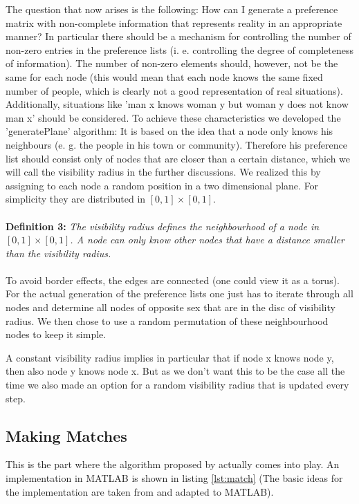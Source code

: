 \documentclass[11pt]{article}
\begin{document}
The question that now arises is the following: How can I generate a preference matrix
with non-complete information that represents reality in an appropriate manner? In 
particular there should be a mechanism for controlling the number of non-zero entries 
in the preference lists (i. e. controlling the degree of completeness of information). The 
number of non-zero elements should, however, not be the same for each node (this would 
mean that each node knows the same fixed number of people, which is clearly not a good 
representation of real situations). Additionally, situations like 'man x knows woman y but 
woman y does not know man x' should be considered.
To achieve these characteristics we developed the 'generatePlane' algorithm: It is based on 
the idea that a node only knows his neighbours (e. g. the people in his town or community). 
Therefore his preference list should consist only of nodes that are closer than a certain 
distance, which we will call the visibility radius in the further discussions. We realized this 
by assigning to each node a random position in a two dimensional plane. For simplicity they 
are distributed in $[0,1]\times[0,1]$. 
\\
\\
\textbf{Definition 3: }\textit{The visibility radius defines the neighbourhood of a node in $[0,1]\times[0,1]$. A node can only know other
nodes that have a distance smaller than the visibility radius.\label{eq:3}}
\\
\\
To avoid border effects, the edges are connected (one could 
view it as a torus). For the actual generation of the preference lists one just has to iterate 
through all nodes and determine all nodes of opposite sex that are in the disc of visibility 
radius. We then chose to use a random permutation of these neighbourhood nodes to keep it 
simple.

A constant visibility radius implies in particular that if node x knows node y, then also node y knows node x. But as we don't want this
to be the case all the time we also made an option for a random visibility radius that is updated every step.

\subsection{Making Matches}

This is the part where the algorithm proposed by \citet{1962} actually comes into play. An implementation in MATLAB is shown in listing
\ref{lst:match} (The basic ideas for the implementation are taken from \citet{rosetta} and adapted to MATLAB).
\end{document}

